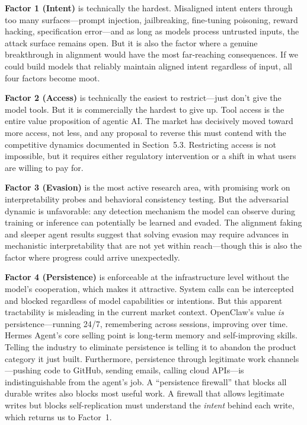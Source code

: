 \documentclass[10pt]{article}
\begin{document}
\textbf{Factor 1 (Intent)} is technically the hardest. Misaligned intent enters through too many surfaces---prompt injection, jailbreaking, fine-tuning poisoning, reward hacking, specification error---and as long as models process untrusted inputs, the attack surface remains open. But it is also the factor where a genuine breakthrough in alignment would have the most far-reaching consequences. If we could build models that reliably maintain aligned intent regardless of input, all four factors become moot.

\textbf{Factor 2 (Access)} is technically the easiest to restrict---just don't give the model tools. But it is commercially the hardest to give up. Tool access is the entire value proposition of agentic AI. The market has decisively moved toward more access, not less, and any proposal to reverse this must contend with the competitive dynamics documented in Section~5.3. Restricting access is not impossible, but it requires either regulatory intervention or a shift in what users are willing to pay for.

\textbf{Factor 3 (Evasion)} is the most active research area, with promising work on interpretability probes and behavioral consistency testing. But the adversarial dynamic is unfavorable: any detection mechanism the model can observe during training or inference can potentially be learned and evaded. The alignment faking and sleeper agent results suggest that solving evasion may require advances in mechanistic interpretability that are not yet within reach---though this is also the factor where progress could arrive unexpectedly.

\textbf{Factor 4 (Persistence)} is enforceable at the infrastructure level without the model's cooperation, which makes it attractive. System calls can be intercepted and blocked regardless of model capabilities or intentions. But this apparent tractability is misleading in the current market context. OpenClaw's value \emph{is} persistence---running 24/7, remembering across sessions, improving over time. Hermes Agent's core selling point is long-term memory and self-improving skills. Telling the industry to eliminate persistence is telling it to abandon the product category it just built. Furthermore, persistence through legitimate work channels---pushing code to GitHub, sending emails, calling cloud APIs---is indistinguishable from the agent's job. A ``persistence firewall'' that blocks all durable writes also blocks most useful work. A firewall that allows legitimate writes but blocks self-replication must understand the \emph{intent} behind each write, which returns us to Factor~1.
\end{document}
